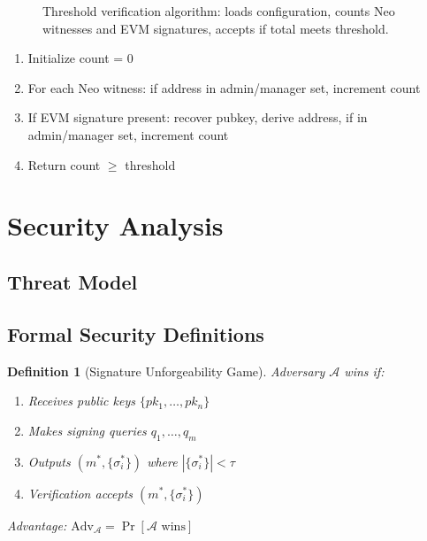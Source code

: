 \documentclass[10pt,twocolumn]{article}
\newtheorem{definition}{Definition}
\begin{document}
{\begin{figure}[t]
\caption{Threshold verification algorithm: loads configuration, counts Neo witnesses and EVM signatures, accepts if total meets threshold.}
\label{fig:threshold-verification}
\end{figure}

\begin{enumerate}[leftmargin=*,topsep=2pt,itemsep=1pt]
\item Initialize count = 0
\item For each Neo witness: if address in admin/manager set, increment count
\item If EVM signature present: recover pubkey, derive address, if in admin/manager set, increment count
\item Return count $\geq$ threshold
\end{enumerate}

\section{Security Analysis}

\subsection{Threat Model}

\subsection{Formal Security Definitions}

\begin{definition}[Signature Unforgeability Game]
Adversary $\mathcal{A}$ wins if:
\begin{enumerate}[leftmargin=*,topsep=2pt,itemsep=1pt]
\item Receives public keys $\{pk_1, \ldots, pk_n\}$
\item Makes signing queries $q_1, \ldots, q_m$
\item Outputs $(m^*, \{\sigma_i^*\})$ where $|\{\sigma_i^*\}| < \tau$
\item Verification accepts $(m^*, \{\sigma_i^*\})$
\end{enumerate}
Advantage: $\text{Adv}_{\mathcal{A}} = \Pr[\mathcal{A} \text{ wins}]$
\end{definition}


}
\end{document}
